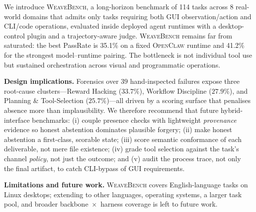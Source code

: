 \documentclass{llmxive}
\providecommand{\Eyeson}{\textsc{WeaveBench}\xspace}
\providecommand{\thetable}{\Alph{section}\arabic{table}}
\providecommand{\thefigure}{\Alph{section}\arabic{figure}}
\providecommand{\thesection}{\Alph{section}}
\providecommand{\section}[1]{  \oldappendixsection{#1}  \setcounter{table}{0}  \setcounter{figure}{0}}
\begin{document}
\section{Conclusion}
\label{sec:conclusion}

We introduce \Eyeson{}, a long-horizon benchmark of 114 tasks across 8 real-world domains that admits only tasks requiring both GUI observation/action and CLI/code operations, evaluated inside deployed agent runtimes with a desktop-control plugin and a trajectory-aware judge. \Eyeson{} remains far from saturated: the best PassRate is 35.1\% on a fixed \textsc{OpenClaw} runtime and 41.2\% for the strongest model--runtime pairing. The bottleneck is not individual tool use but sustained orchestration across visual and programmatic operations.

\smallskip
\noindent\textbf{Design implications.}
Forensics over $39$ hand-inspected failures expose three root-cause clusters---Reward Hacking ($33.7\%$), Workflow Discipline ($27.9\%$), and Planning \& Tool-Selection ($25.7\%$)---all driven by a scoring surface that penalises absence more than implausibility. We therefore recommend that future hybrid-interface benchmarks: (i) couple presence checks with lightweight \emph{provenance} evidence so honest abstention dominates plausible forgery; (ii) make honest abstention a first-class, scorable state; (iii) score semantic conformance of each deliverable, not mere file existence; (iv) grade tool selection against the task's channel \emph{policy}, not just the outcome; and (v) audit the process trace, not only the final artifact, to catch CLI-bypass of GUI requirements.

\smallskip
\noindent\textbf{Limitations and future work.}
\Eyeson{} covers English-language tasks on Linux desktops; extending to other languages, operating systems, a larger task pool, and broader backbone~$\times$~harness coverage is left to future work.


\FloatBarrier




\appendix
\setcounter{table}{0}
\setcounter{figure}{0}
\setcounter{section}{0}
\renewcommand{\thetable}{\Alph{section}\arabic{table}}
\renewcommand{\thefigure}{\Alph{section}\arabic{figure}}
\renewcommand{\thesection}{\Alph{section}}
\end{document}
